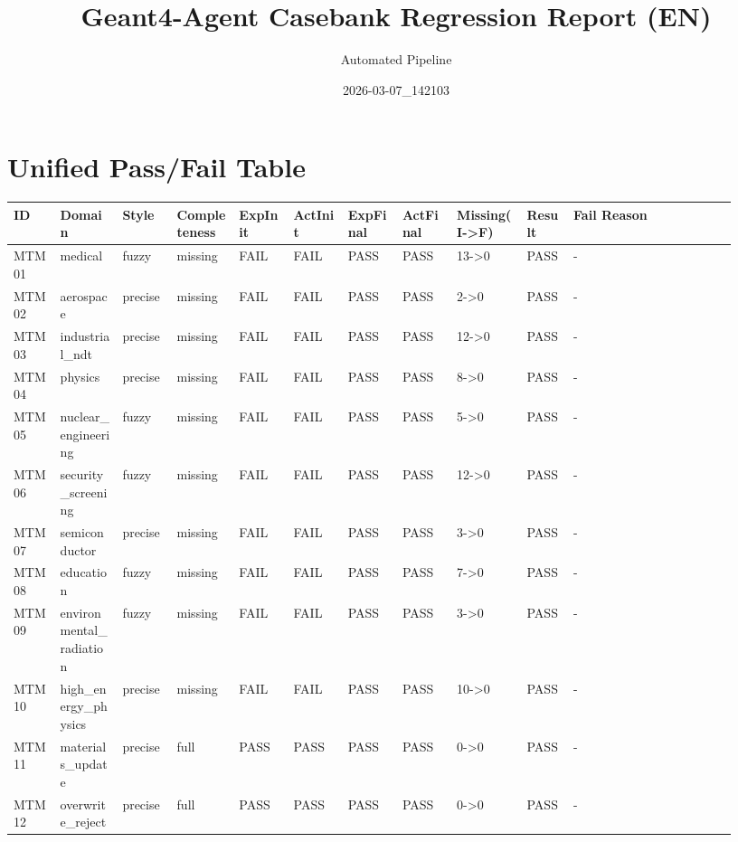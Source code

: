 \documentclass[11pt]{ctexart}
\title{Geant4-Agent Casebank Regression Report (EN)}
\author{Automated Pipeline}
\date{2026-03-07\_142103}
\begin{document}
\maketitle
\section{Unified Pass/Fail Table}
\begin{longtable}{p{0.06\linewidth}p{0.08\linewidth}p{0.07\linewidth}p{0.08\linewidth}p{0.07\linewidth}p{0.07\linewidth}p{0.07\linewidth}p{0.07\linewidth}p{0.09\linewidth}p{0.06\linewidth}p{0.21\linewidth}}
\toprule
ID & Domain & Style & Completeness & ExpInit & ActInit & ExpFinal & ActFinal & Missing(I->F) & Result & Fail Reason \\
\midrule
MTM01 & medical & fuzzy & missing & FAIL & FAIL & PASS & PASS & 13->0 & PASS & - \\
MTM02 & aerospace & precise & missing & FAIL & FAIL & PASS & PASS & 2->0 & PASS & - \\
MTM03 & industrial\_ndt & precise & missing & FAIL & FAIL & PASS & PASS & 12->0 & PASS & - \\
MTM04 & physics & precise & missing & FAIL & FAIL & PASS & PASS & 8->0 & PASS & - \\
MTM05 & nuclear\_engineering & fuzzy & missing & FAIL & FAIL & PASS & PASS & 5->0 & PASS & - \\
MTM06 & security\_screening & fuzzy & missing & FAIL & FAIL & PASS & PASS & 12->0 & PASS & - \\
MTM07 & semiconductor & precise & missing & FAIL & FAIL & PASS & PASS & 3->0 & PASS & - \\
MTM08 & education & fuzzy & missing & FAIL & FAIL & PASS & PASS & 7->0 & PASS & - \\
MTM09 & environmental\_radiation & fuzzy & missing & FAIL & FAIL & PASS & PASS & 3->0 & PASS & - \\
MTM10 & high\_energy\_physics & precise & missing & FAIL & FAIL & PASS & PASS & 10->0 & PASS & - \\
MTM11 & materials\_update & precise & full & PASS & PASS & PASS & PASS & 0->0 & PASS & - \\
MTM12 & overwrite\_reject & precise & full & PASS & PASS & PASS & PASS & 0->0 & PASS & - \\
\bottomrule
\end{longtable}
\end{document}
